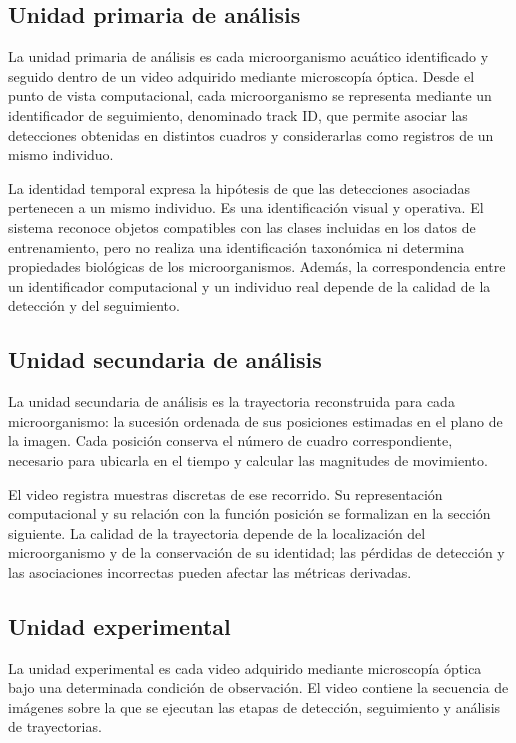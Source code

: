 \subsection{Unidad primaria de análisis}

La unidad primaria de análisis es cada microorganismo acuático identificado y seguido dentro de un video adquirido mediante microscopía óptica. Desde el punto de vista computacional, cada microorganismo se representa mediante un identificador de seguimiento, denominado track ID, que permite asociar las detecciones obtenidas en distintos cuadros y considerarlas como registros de un mismo individuo.

La identidad temporal expresa la hipótesis de que las detecciones asociadas pertenecen a un mismo individuo. Es una identificación visual y operativa. El sistema reconoce objetos compatibles con las clases incluidas en los datos de entrenamiento, pero no realiza una identificación taxonómica ni determina propiedades biológicas de los microorganismos. Además, la correspondencia entre un identificador computacional y un individuo real depende de la calidad de la detección y del seguimiento.

\subsection{Unidad secundaria de análisis}

La unidad secundaria de análisis es la trayectoria reconstruida para cada microorganismo: la sucesión ordenada de sus posiciones estimadas en el plano de la imagen. Cada posición conserva el número de cuadro correspondiente, necesario para ubicarla en el tiempo y calcular las magnitudes de movimiento.

El video registra muestras discretas de ese recorrido. Su representación computacional y su relación con la función posición se formalizan en la sección siguiente. La calidad de la trayectoria depende de la localización del microorganismo y de la conservación de su identidad; las pérdidas de detección y las asociaciones incorrectas pueden afectar las métricas derivadas.

\subsection{Unidad experimental}

La unidad experimental es cada video adquirido mediante microscopía óptica bajo una determinada condición de observación. El video contiene la secuencia de imágenes sobre la que se ejecutan las etapas de detección, seguimiento y análisis de trayectorias.

